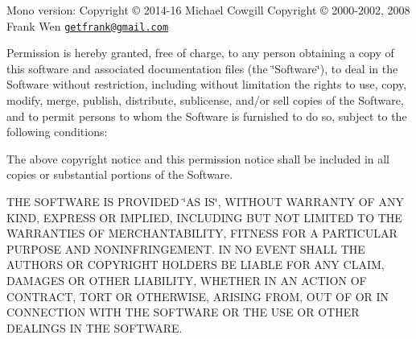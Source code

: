 Mono version\+: Copyright © 2014-\/16 Michael Cowgill Copyright © 2000-\/2002, 2008 Frank Wen \href{mailto:getfrank@gmail.com}{\tt getfrank@gmail.\+com}

Permission is hereby granted, free of charge, to any person obtaining a copy of this software and associated documentation files (the \char`\"{}\+Software\char`\"{}), to deal in the Software without restriction, including without limitation the rights to use, copy, modify, merge, publish, distribute, sublicense, and/or sell copies of the Software, and to permit persons to whom the Software is furnished to do so, subject to the following conditions\+:

The above copyright notice and this permission notice shall be included in all copies or substantial portions of the Software.

T\+HE S\+O\+F\+T\+W\+A\+RE IS P\+R\+O\+V\+I\+D\+ED \char`\"{}\+A\+S I\+S\char`\"{}, W\+I\+T\+H\+O\+UT W\+A\+R\+R\+A\+N\+TY OF A\+NY K\+I\+ND, E\+X\+P\+R\+E\+SS OR I\+M\+P\+L\+I\+ED, I\+N\+C\+L\+U\+D\+I\+NG B\+UT N\+OT L\+I\+M\+I\+T\+ED TO T\+HE W\+A\+R\+R\+A\+N\+T\+I\+ES OF M\+E\+R\+C\+H\+A\+N\+T\+A\+B\+I\+L\+I\+TY, F\+I\+T\+N\+E\+SS F\+OR A P\+A\+R\+T\+I\+C\+U\+L\+AR P\+U\+R\+P\+O\+SE A\+ND N\+O\+N\+I\+N\+F\+R\+I\+N\+G\+E\+M\+E\+NT. IN NO E\+V\+E\+NT S\+H\+A\+LL T\+HE A\+U\+T\+H\+O\+RS OR C\+O\+P\+Y\+R\+I\+G\+HT H\+O\+L\+D\+E\+RS BE L\+I\+A\+B\+LE F\+OR A\+NY C\+L\+A\+IM, D\+A\+M\+A\+G\+ES OR O\+T\+H\+ER L\+I\+A\+B\+I\+L\+I\+TY, W\+H\+E\+T\+H\+ER IN AN A\+C\+T\+I\+ON OF C\+O\+N\+T\+R\+A\+CT, T\+O\+RT OR O\+T\+H\+E\+R\+W\+I\+SE, A\+R\+I\+S\+I\+NG F\+R\+OM, O\+UT OF OR IN C\+O\+N\+N\+E\+C\+T\+I\+ON W\+I\+TH T\+HE S\+O\+F\+T\+W\+A\+RE OR T\+HE U\+SE OR O\+T\+H\+ER D\+E\+A\+L\+I\+N\+GS IN T\+HE S\+O\+F\+T\+W\+A\+RE. 